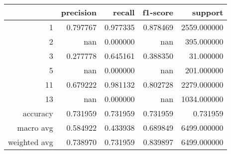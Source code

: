 \begin{tabular}{rrrrr}
\toprule
 & precision & recall & f1-score & support \\
\midrule
1 & 0.797767 & 0.977335 & 0.878469 & 2559.000000 \\
2 & nan & 0.000000 & nan & 395.000000 \\
3 & 0.277778 & 0.645161 & 0.388350 & 31.000000 \\
5 & nan & 0.000000 & nan & 201.000000 \\
11 & 0.679222 & 0.981132 & 0.802728 & 2279.000000 \\
13 & nan & 0.000000 & nan & 1034.000000 \\
accuracy & 0.731959 & 0.731959 & 0.731959 & 0.731959 \\
macro avg & 0.584922 & 0.433938 & 0.689849 & 6499.000000 \\
weighted avg & 0.738970 & 0.731959 & 0.839897 & 6499.000000 \\
\bottomrule
\end{tabular}
